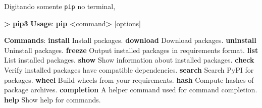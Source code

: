 \documentclass[11pt]{article}
\newenvironment{Shaded}{}{}
\newcommand{\KeywordTok}[1]{\textcolor[rgb]{0.00,0.44,0.13}{\textbf{{#1}}}}
\newcommand{\NormalTok}[1]{{#1}}
\begin{document}
Digitando somente \texttt{pip} no terminal,

\begin{Shaded}
\begin{Highlighting}[]
\KeywordTok{>} \KeywordTok{pip3} 
\KeywordTok{Usage}\NormalTok{:   }
  \KeywordTok{pip} \KeywordTok{<}\NormalTok{command}\KeywordTok{>} \NormalTok{[options]}

\KeywordTok{Commands}\NormalTok{:}
  \KeywordTok{install}                     \NormalTok{Install packages.}
  \KeywordTok{download}                    \NormalTok{Download packages.}
  \KeywordTok{uninstall}                   \NormalTok{Uninstall packages.}
  \KeywordTok{freeze}                      \NormalTok{Output installed packages in requirements format.}
  \KeywordTok{list}                        \NormalTok{List installed packages.}
  \KeywordTok{show}                        \NormalTok{Show information about installed packages.}
  \KeywordTok{check}                       \NormalTok{Verify installed packages have compatible dependencies.}
  \KeywordTok{search}                      \NormalTok{Search PyPI for packages.}
  \KeywordTok{wheel}                       \NormalTok{Build wheels from your requirements.}
  \KeywordTok{hash}                        \NormalTok{Compute hashes of package archives.}
  \KeywordTok{completion}                  \NormalTok{A helper command used for command completion.}
  \KeywordTok{help}                        \NormalTok{Show help for commands.}


\end{Highlighting}
\end{Shaded}
\end{document}
